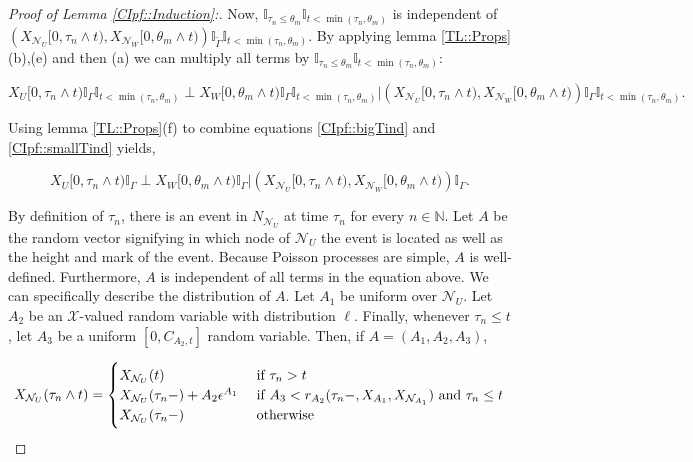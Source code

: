 \documentclass[12pt]{article}
\newcommand{\mb}{\mathbb}
\newcommand{\mc}{\mathcal}
\newcommand{\te}{\text}
\newcommand{\ep}{\epsilon}
\newcommand{\sta}{\mc{X}}							%
\newcommand{\neigh}[1]{\mc{N}_{#1}}					%
\newcommand{\Xf}{X}									%
\newcommand{\poiss}{N}								%
\newcommand{\Sm}{\ell}								%
\newcommand{\rate}{r}								%
\newcommand{\poissv}[1]{_{#1}}						%
\newcommand{\vind}[1]{_{#1}}						%
\newcommand{\tme}[1]{(#1)}							%
\newcommand{\tmi}[1]{#1}							%
\newcommand{\stpara}[1]{_{#1}}						%
\newcommand{\jumpibd}[2]{C_{#1,#2}}					%
\newcommand{\tmepro}[3]{
\ifstrempty{#3}{
	(#1,#2)}{
	(#1,#2,#3)}}									%
\newcommand{\alt}[1]{\tilde{#1}}					%
\newcommand{\rt}{\tau}								%
\newcommand{\ev}[1]{\ep^{#1}}						%
\renewcommand{\it}[1]{_{#1}}						%
\newcommand{\seto}{U}								%
\newcommand{\sett}{W}								%
\newcommand{\rtt}{\theta}							%
\newcommand{\apath}{\Gamma}						%
\newcommand{\rv}{A}								%
\newcommand{\indo}{n}							%
\newcommand{\indt}{m}							%
\begin{document}
\begin{proof}[Proof of Lemma \ref{CIpf::Induction}:]
Now, \(\mb{I}_{\rt\it{\indo} \leq \rtt\it{\indt}}\mb{I}_{t < \min(\rt\it{\indo},\rtt\it{\indt})}\) is independent of \(\left(\Xf\vind{\neigh{\seto}}\tmi{[0,\rt\it{\indo}\wedge t)},\Xf\vind{\neigh{\sett}}\tmi{[0,\rtt\it{\indt}\wedge t)}\right)\mb{I}_{\alt{\apath}}\mb{I}_{t < \min(\rt\it{\indo},\rtt\it{\indt})}\). By applying lemma \ref{TL::Props} (b),(e) and then (a) we can multiply all terms by \(\mb{I}_{\rt\it{\indo} \leq \rtt\it{\indt}}\mb{I}_{t < \min(\rt\it{\indo},\rtt\it{\indt})}\):

\begin{equation}
\Xf\vind{\seto}\tmi{[0,\rt\it{\indo}\wedge t)}\mb{I}_{\apath}\mb{I}_{t < \min(\rt\it{\indo},\rtt\it{\indt})}\perp \Xf\vind{\sett}\tmi{[0,\rtt\it{\indt}\wedge t)}\mb{I}_{\apath}\mb{I}_{t < \min(\rt\it{\indo},\rtt\it{\indt})}|\left(\Xf\vind{\neigh{\seto}}\tmi{[0,\rt\it{\indo}\wedge t)},\Xf\vind{\neigh{\sett}}\tmi{[0,\rtt\it{\indt}\wedge t)}\right)\mb{I}_{\apath}\mb{I}_{t < \min(\rt\it{\indo},\rtt\it{\indt})}.
\label{CIpf::smallTind}
\end{equation}

Using lemma \ref{TL::Props}(f) to combine equations \eqref{CIpf::bigTind} and \eqref{CIpf::smallTind} yields,

\[\Xf\vind{\seto}\tmi{[0,\rt\it{\indo}\wedge t)}\mb{I}_{\apath}\perp \Xf\vind{\sett}\tmi{[0,\rtt\it{\indt}\wedge t)}\mb{I}_{\apath}|\left(\Xf\vind{\neigh{\seto}}\tmi{[0,\rt\it{\indo}\wedge t)},\Xf\vind{\neigh{\sett}}\tmi{[0,\rtt\it{\indt}\wedge t)}\right)\mb{I}_{\apath}.\]

By definition of \(\rt\it{\indo}\), there is an event in \(\poiss\poissv{\neigh{\seto}}\) at time \(\rt\it{\indo}\) for every \(\indo \in \mb{ N}\). Let \(\rv\) be the random vector signifying in which node of \(\neigh{\seto}\) the event is located as well as the height and mark of the event. Because Poisson processes are simple, \(\rv\) is well-defined. Furthermore, \(\rv\) is independent of all terms in the equation above. We can specifically describe the distribution of \(\rv\). Let \(\rv\vind{1}\) be uniform over \(\neigh{\seto}\). Let \(\rv\vind{2}\) be an \(\sta\)-valued random variable with distribution \(\Sm\). Finally, whenever \(\rt\it{\indo} \leq t\), let \(\rv\vind{3}\) be a uniform \([0,\jumpibd{\rv\vind{2}}{t}]\) random variable. Then, if \(\rv=(\rv\vind{1},\rv\vind{2},\rv\vind{3})\),

\[\Xf\vind{\neigh{\seto}}\tme{\rt\it{\indo}\wedge t} = \begin{cases}
\Xf\vind{\neigh{\seto}}\tme{t} &\te{ if } \rt\it{\indo} > t\\
\Xf\vind{\neigh{\seto}}\tme{\rt\it{\indo}-} + \rv\vind{2}\ev{\rv\vind{1}} &\te{ if } \rv\vind{3}< \rate\stpara{\rv\vind{2}}\tmepro{\rt\it{\indo}-}{\Xf\vind{\rv\vind{1}}}{\Xf\vind{\neigh{\rv\vind{1}}}}\te{ and } \rt\it{\indo} \leq t\\
\Xf\vind{\neigh{\seto}}\tme{\rt\it{\indo}-} &\te{ otherwise}
\end{cases}\]


\end{proof}
\end{document}
